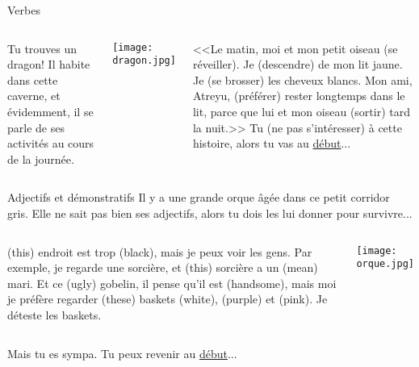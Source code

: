 \documentclass{beamer}
\begin{document}
  \begin{frame}{Verbes}
    \hypertarget{verbes}{}
    \begin{columns}
        Tu trouves un dragon!
        Il habite dans cette caverne, et évidemment, il se parle de ses activités au cours de la journée.
        \begin{center}
          \texttt{[image: dragon.jpg]}
        \end{center}
        <<Le matin, moi et mon petit oiseau \underline{} (se réveiller).
        Je \underline{} (descendre) de mon lit jaune.
        Je \underline{} (se brosser) les cheveux blancs.
        Mon ami, Atreyu, \underline{} (préférer) rester longtemps dans le lit, parce que lui et mon oiseau \underline{} (sortir) tard la nuit.>>
        Tu \underline{} (ne pas s'intéresser) à cette histoire, alors tu vas au \hyperlink{début}{début}...
    \end{columns}
  \end{frame}

  \begin{frame}{Adjectifs et démonstratifs}
    \hypertarget{adjectifs}{}
    Il y a une grande orque âgée dans ce petit corridor gris.
    Elle ne sait pas bien ses adjectifs, alors tu dois les lui donner pour survivre...

    \vspace{0.25cm}
    \begin{columns}
        \small
        \underline{} (this) endroit est trop \underline{} (black), mais je peux voir les gens.
        Par exemple, je regarde une sorcière, et \underline{} (this) sorcière a un \underline{} (mean) mari.
        Et ce \underline{} (ugly) gobelin, il pense qu'il est \underline{} (handsome), mais moi je préfère regarder \underline{} (these) baskets \underline{} (white), \underline{} (purple) et \underline{} (pink).
        Je déteste les baskets.

        \begin{center}
          \texttt{[image: orque.jpg]}
        \end{center}
    \end{columns}
    \vspace{0.25cm}
    Mais tu es sympa.
    Tu peux revenir au \hyperlink{début}{début}...
  \end{frame}
\end{document}
